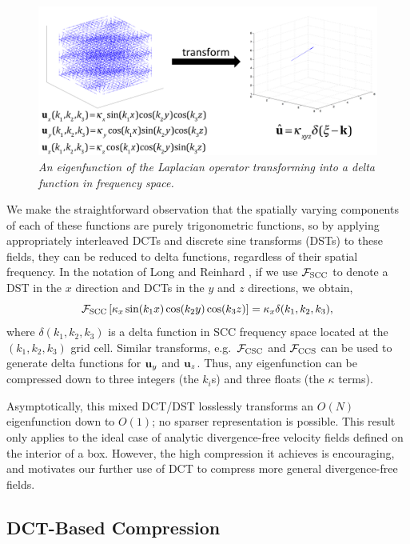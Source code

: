 \begin{figure}
\label{fig:laplacians}
\includegraphics[width=\textwidth]{chap4/figures/laplacian_sparsity.png}
\caption{\em An eigenfunction of the Laplacian operator transforming into a delta function in frequency space.}
\end{figure}

We make the straightforward observation that the spatially varying components of each of these functions are purely trigonometric functions, so by applying appropriately interleaved DCTs and discrete sine transforms (DSTs) to these fields, they can be reduced to delta functions, regardless of their spatial frequency. In the notation of Long and Reinhard \cite{long2009}, if we use $\mathcal{F}_\textrm{SCC}$ to denote a DST in the $x$ direction and DCTs in the $y$ and $z$ directions, we obtain,
\begin{equation}
\mathcal{F}_\textrm{SCC}\left[\kappa_x\sin(k_1 x) \cos(k_2 y) \cos(k_3 z)\right] = \kappa_x\delta(k_1, k_2, k_3),
\end{equation}
where $\delta(k_1, k_2, k_3)$ is a delta function in SCC frequency space located at the $(k_1, k_2, k_3)$ grid cell. Similar transforms, e.g.~$\mathcal{F}_\textrm{CSC}$ and $\mathcal{F}_\textrm{CCS}$ can be used to generate delta functions for $\mathbf{u}_y$ and $\mathbf{u}_z$. Thus, any eigenfunction can be compressed down to three integers (the $k_i$s) and three floats (the $\kappa$ terms).

Asymptotically, this mixed DCT/DST losslessly transforms an $O(N)$ eigenfunction down to $O(1)$; no sparser representation is possible. This result only applies to the ideal case of analytic divergence-free velocity fields defined on the interior of a box. However, the high compression it achieves is encouraging, and motivates our further use of DCT to compress more general divergence-free fields.

\subsection{DCT-Based Compression}

